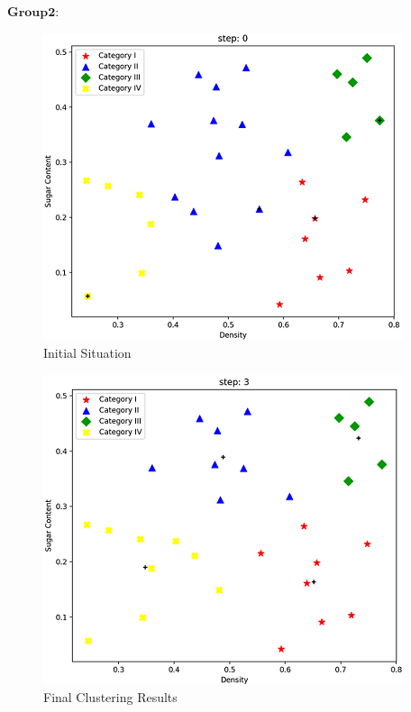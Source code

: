 \documentclass[homework]{IEEEtran}
\begin{document}
\begin{CJK}{UTF8}{gkai}
$\mathbf{Group 2}$:
\begin{figure}[htb]
    \centerline{\includegraphics{Images/fig19.png}}
    \caption{Initial Situation}
    \label{fig19}
    \end{figure}

\begin{figure}[htb]
    \centerline{\includegraphics{Images/fig20.png}}
    \caption{Final Clustering Results}
    \label{fig20}
    \end{figure} \par


\end{CJK}
\end{document}
